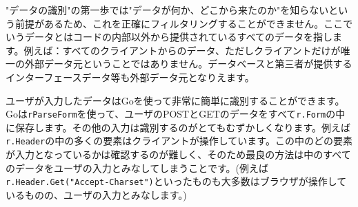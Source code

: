 "データの識別"の第一歩では"データが何か、どこから来たのか"を知らないという前提があるため、これを正確にフィルタリングすることができません。ここでいうデータとはコードの内部以外から提供されているすべてのデータを指します。例えば：すべてのクライアントからのデータ、ただしクライアントだけが唯一の外部データ元ということではありません。データベースと第三者が提供するインターフェースデータ等も外部データ元となりえます。

ユーザが入力したデータはGoを使って非常に簡単に識別することができます。Goは\texttt{rParseForm}を使って、ユーザのPOSTとGETのデータをすべて\texttt{r.Form}の中に保存します。その他の入力は識別するのがとてもむずかしくなります。例えば\texttt{r.Header}の中の多くの要素はクライアントが操作しています。この中のどの要素が入力となっているかは確認するのが難しく、そのため最良の方法は中のすべてのデータをユーザの入力とみなしてしまうことです。(例えば\texttt{r.Header.Get("Accept-Charset")}といったものも大多数はブラウザが操作しているものの、ユーザの入力とみなします。)
